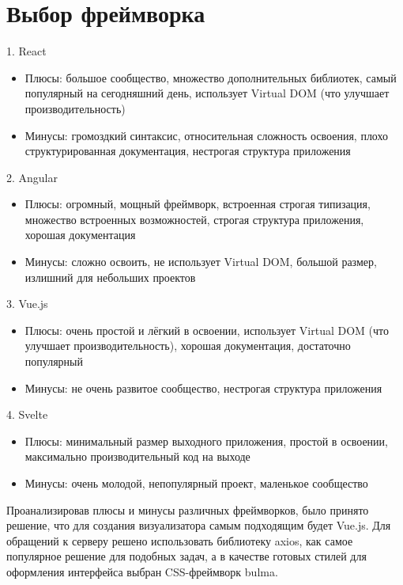 \section{Выбор фреймворка} \label{ch4:sec5}
1.	React
\begin{itemize}
\item Плюсы: большое сообщество, множество дополнительных библиотек, самый популярный на сегодняшний день, использует Virtual DOM (что улучшает производительность)
\item Минусы: громоздкий синтаксис, относительная сложность освоения, плохо структурированная документация, нестрогая структура приложения
\end{itemize}

2.	Angular
\begin{itemize}
\item Плюсы: огромный, мощный фреймворк, встроенная строгая типизация, множество встроенных возможностей, строгая структура приложения, хорошая документация
\item Минусы: сложно освоить, не использует Virtual DOM, большой размер, излишний для небольших проектов
\end{itemize}

3.	Vue.js
\begin{itemize}
\item Плюсы: очень простой и лёгкий в освоении, использует Virtual DOM (что улучшает производительность), хорошая документация, достаточно популярный
\item Минусы: не очень развитое сообщество, нестрогая структура приложения
\end{itemize}

4.	Svelte
\begin{itemize}
\item Плюсы: минимальный размер выходного приложения, простой в освоении, максимально производительный код на выходе
\item Минусы: очень молодой, непопулярный проект, маленькое сообщество
\end{itemize}

Проанализировав плюсы и минусы различных фреймворков, было принято решение, что для создания визуализатора самым подходящим будет Vue.js. Для обращений к серверу решено использовать библиотеку axios, как самое популярное решение для подобных задач, а в качестве готовых стилей для оформления интерфейса выбран CSS-фреймворк bulma.
